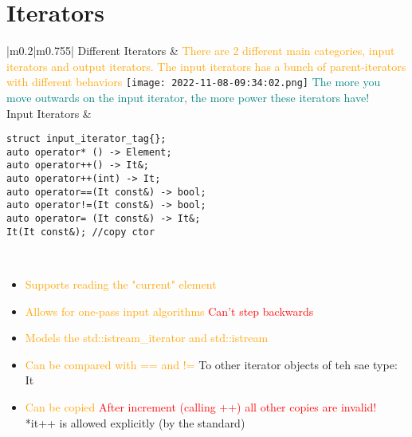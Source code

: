 \documentclass[main.tex,fontsize=8pt,paper=a4,paper=portrait,DIV=calc,]{scrartcl}
\begin{document}
\begin{table}[ht!]
\section{Iterators}
\begin{tabular}{|m{0.2\linewidth}|m{0.755\linewidth}|}
\hline
Different Iterators & 
\textcolor{orange}{There are 2 different main categories, input iterators and output iterators.\newline
The input iterators has a bunch of parent-iterators with different behaviors}\newline
\texttt{[image: 2022-11-08-09:34:02.png]}\newline
\textcolor{teal}{The more you move outwards on the input iterator, the more power these iterators have!}\\
\hline
Input Iterators & 
\begin{lstlisting}
struct input_iterator_tag{};
auto operator* () -> Element;
auto operator++() -> It&;
auto operator++(int) -> It;
auto operator==(It const&) -> bool;
auto operator!=(It const&) -> bool;
auto operator= (It const&) -> It&;
It(It const&); //copy ctor
\end{lstlisting} 
\, \newline
\begin{itemize}
\item \textcolor{orange}{Supports reading the "current" element}
\item \textcolor{orange}{Allows for one-pass input algorithms}\newline
  \textcolor{red}{Can't step backwards}
\item \textcolor{orange}{Models the std::istream\_iterator and std::istream}
\item \textcolor{orange}{Can be compared with == and !=}\newline
  To other iterator objects of teh sae type: It
\item \textcolor{orange}{Can be copied}\newline
  \textcolor{red}{After increment (calling ++) all other copies are invalid!}\newline
  *it++ is allowed explicitly (by the standard)
\vspace{-2mm}
\end{itemize}\\
\hline
\end{tabular}
\end{table}
\pagebreak
\end{document}
